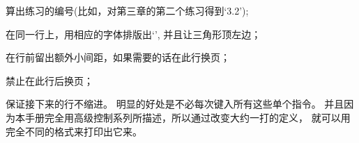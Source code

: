 \nobreak\medskip
\item\bull 算出练习的编号(比如，对第三章的第二个练习得到`3.2');
\smallskip
\item\bull 在同一行上，用相应的字体排版出`', 并且让三角形顶左边；
\smallskip
\item\bull 在行前留出额外小间距，如果需要的话在此行换页；
\smallskip
\item\bull 禁止在此行后换页；
\smallskip
\item\bull 保证接下来的行不缩进。
\medbreak\noindent
明显的好处是不必每次键入所有这些单个指令。%
并且因为本手册完全用高级控制系列所描述，所以通过改变大约一打的定义，
就可以用完全不同的格式来打印出它来。

